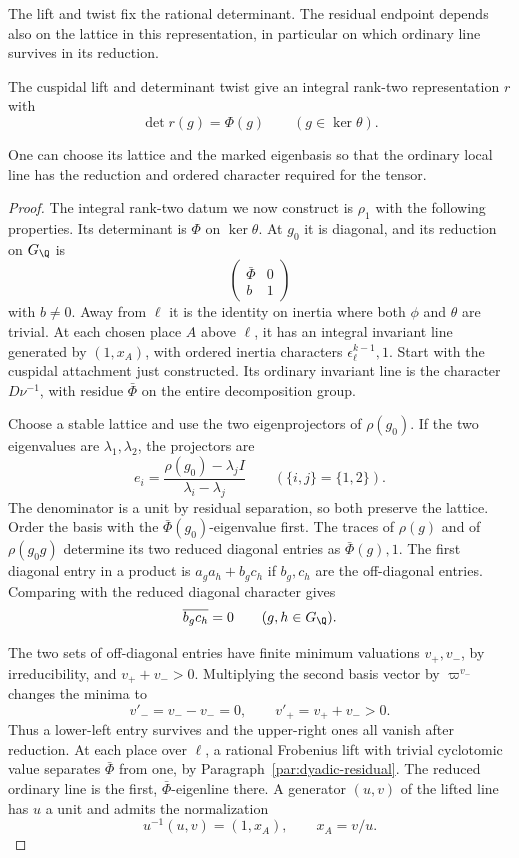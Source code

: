 The lift and twist fix the rational determinant. The residual endpoint depends also on the lattice in this representation, in particular on which ordinary line survives in its reduction.

\begin{proposition}\label{prop:count-three-ordinary-lattice}
The cuspidal lift and determinant twist give an integral rank-two representation \(r\) with 
\[
 \det r(g)=\Phi(g)\qquad(g\in\ker\theta).
\]

One can choose its lattice and the marked eigenbasis so that
the ordinary local line has the reduction and ordered
character required for the tensor.
\end{proposition}

\begin{proof}

The integral rank-two datum we now construct is
\(\rho_1\) with the following properties. Its determinant
is \(\Phi\) on \(\ker\theta\). At \(g_0\) it is diagonal,
and its reduction on \(G_{\Q}\) is
\[
                  \begin{pmatrix}\bar\Phi&0\\b&1\end{pmatrix}
\]
with \(b\ne0\). Away from \(\ell\) it is the identity on
inertia where both \(\phi\) and \(\theta\) are trivial.
At each chosen place \(A\) above \(\ell\), it has an
integral invariant line generated by \((1,x_A)\),
with ordered inertia characters \(\epsilon_\ell^{k-1},1\).
Start with the cuspidal attachment just constructed. Its
ordinary invariant line is the character \(D\nu^{-1}\), with
residue \(\bar\Phi\) on the entire decomposition group.

Choose a stable lattice and use the two eigenprojectors
of \(\rho(g_0)\). If the two eigenvalues are \(\lambda_1,\lambda_2\), the projectors are
\[
 e_i=\frac{\rho(g_0)-\lambda_j I}{\lambda_i-\lambda_j}
 \qquad(\{i,j\}=\{1,2\}).
\]
The denominator is a unit by residual separation, so both preserve the lattice. Order the basis
with the \(\bar\Phi(g_0)\)-eigenvalue first. The traces
of \(\rho(g)\) and of \(\rho(g_0g)\) determine its
two reduced diagonal entries as \(\bar\Phi(g),1\).
The first diagonal entry in a product is
\(a_ga_h+b_gc_h\) if \(b_g,c_h\) are the off-diagonal
entries. Comparing with the reduced diagonal character gives
\[
                  \overline{b_gc_h}=0\qquad(g,h\in G_\Q).
\]

The two sets of off-diagonal entries have finite
minimum valuations \(v_+,v_-\), by irreducibility,
and \(v_++v_->0\). Multiplying the second basis vector by \(\varpi^{v_-}\)
changes the minima to
\[
           v'_-=v_--v_-=0,\qquad v'_+=v_++v_->0.
\]
Thus a lower-left entry survives and the upper-right ones all
vanish after reduction.
At each place over \(\ell\), a rational Frobenius
lift with trivial cyclotomic value separates \(\bar\Phi\)
from one, by Paragraph~\ref{par:dyadic-residual}.
The reduced ordinary line is the first, \(\bar\Phi\)-eigenline there. A generator \((u,v)\) of the lifted line has \(u\) a unit and admits the normalization
\[
 u^{-1}(u,v)=(1,x_A),\qquad x_A=v/u.
\]



\end{proof}
